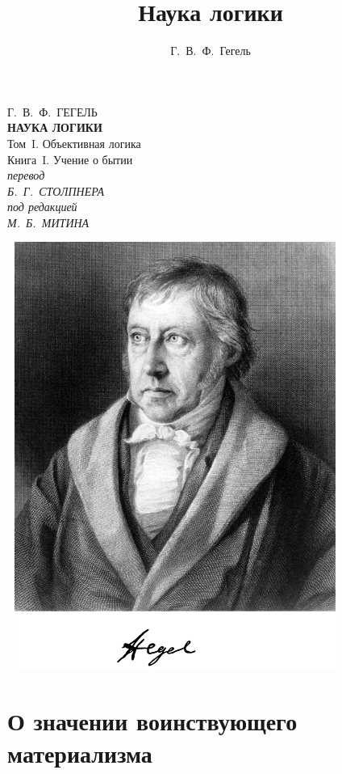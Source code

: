 \documentclass[b5paper, 11pt, twoside, onecolumn, openany]{memoir}
\author{Г.~В.~Ф.~Гегель}
\title{Наука логики}
\date{}
\begin{document}
\frontmatter
\pagestyle{empty}

{\centering
  {\Large Г.~В.~Ф.~ГЕГЕЛЬ} \\
  \vspace{130pt}
  \textbf{\Huge НАУКА ЛОГИКИ} \\
  \vspace{12pt}
  {\Large Том~I. Объективная логика} \\
  \vspace{8pt}
  {\large Книга~I. Учение о бытии} \\
  \vspace{45pt}
  \textit{перевод} \\
  \textit{Б.~Г.~СТОЛПНЕРА} \\
  \vspace{10pt}
  \textit{под редакцией} \\
  \textit{М.~Б.~МИТИНА}
\par}

\clearpage

\begin{center}
\includegraphics[width=11cm,height=14cm]{hegel-img001.png}
\end{center}

\part[О значении воинствующего материализма]{О значении воинствующего материализма}
\pagestyle{plain}
\setcounter{page}{1}

\end{document}
